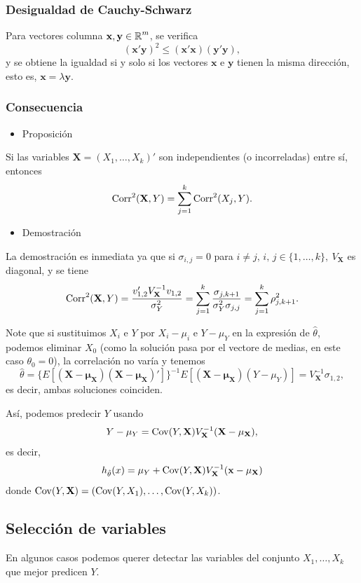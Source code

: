 \subsubsection{Desigualdad de Cauchy-Schwarz}
Para vectores columna $\mathbf{x,y}\in\operatorname{\mathbb{R}}^m$, se verifica \[ (\mathbf{x'y})^2\le(\mathbf{x'x})(\mathbf{y'y}), \]y se obtiene la igualdad si y solo si los vectores $\mathbf{x}$ e $\mathbf{y}$ tienen la misma dirección, esto es, $\mathbf{x}=\lambda\mathbf{y}$.
\subsubsection{Consecuencia}
\begin{itemize}[label=\color{red}\textbullet, leftmargin=*]
	\item \color{lightblue}Proposición
\end{itemize}
Si las variables $\mathbf{X}=(X_1,\dots,X_k)'$ son independientes (o incorreladas) entre sí, entonces \[ \operatorname{Corr}^2(\mathbf{X},Y)=\sum_{j=1}^{k}\operatorname{Corr}^2(X_j,Y). \]
\begin{itemize}[label=\color{red}\textbullet, leftmargin=*]
	\item \color{lightblue}Demostración
\end{itemize}
La demostración es inmediata ya que si $\sigma_{i,j}=0$ para $i\neq j,\,i,\,j\in\{1,\dots,k\},\:V_{\mathbf{X}}$ es diagonal, y se tiene \[ \operatorname{Corr}^2(\mathbf{X},Y)=\dfrac{v_{1,2}'V_{\mathbf{X}}^{-1}v_{1,2}}{\sigma_Y^2}=\sum_{j=1}^{k}\dfrac{\sigma_{j,k+1}}{\sigma_Y^2\sigma_{j,j}}=\sum_{j=1}^{k}\rho_{j,k+1}^2. \]

Note que si sustituimos $X_i$ e $Y$ por $X_i-\mu_i$ e $Y-\mu_Y$ en la expresión de $\hat{\theta}$, podemos eliminar $X_0$ (como la solución pasa por el vectore de medias, en este caso $\theta_0=0$), la correlación no varía y tenemos \[ \hat{\theta}=\{E[(\mathbf{X-\mu_X})(\mathbf{X-\mu_X})']\}^{-1}E[(\mathbf{X-\mu_X})(Y-\mu_Y)]=V_{\mathbf{X}}^{-1}\sigma_{1,2}, \]es decir, ambas soluciones coinciden.

Así, podemos predecir $Y$ usando \[ Y-\mu_Y=\operatorname{Cov}(Y,\mathbf{X})V_{\mathbf{X}}^{-1}(\mathbf{X-\mu_X}), \]es decir, \[ h_{\hat{\theta}}(x)=\mu_Y+\operatorname{Cov}(Y,\mathbf{X})V_{\mathbf{X}}^{-1}(\mathbf{x-\mu_X}) \]donde $\operatorname{Cov}(Y,\mathbf{X})=(\operatorname{Cov}(Y,X_1),\dots,\operatorname{Cov}(Y,X_k))$.
\subsection{Selección de variables}
En algunos casos podemos querer detectar las variables del conjunto $X_1,\dots,X_k$ que mejor predicen $Y$.
